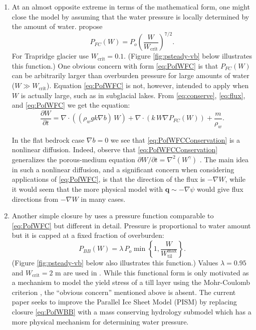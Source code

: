 \documentclass[11pt,final]{amsart}
\newcommand\bq{\mathbf{q}}
\newcommand{\Div}{\nabla\cdot}
\newcommand{\grad}{\nabla}
\newcommand{\Wtilmax}{W_{\text{til}}^{\text{max}}}
\begin{document}
\begin{enumerate}
\medskip

\item At an almost opposite extreme in terms of the mathematical form, one might close the model by assuming that the water pressure is locally determined by the amount of water.  \cite{FlowersClarke2002_theory} propose
\begin{equation}
P_{FC}(W) = P_o \left(\frac{W}{W_{\text{crit}}}\right)^{7/2}. \label{eq:PofWFC}
\end{equation}
For Trapridge glacier \cite{FlowersClarke2002_trapridge} use $W_{\text{crit}}=0.1$.  (Figure \ref{fig:psteady-vb} below illustrates this function.)  One obvious concern with form \eqref{eq:PofWFC} is that $P_{FC}(W)$ can be arbitrarily larger than overburden pressure for large amounts of water ($W \gg W_{\text{crit}}$).  Equation \eqref{eq:PofWFC} is not, however, intended to apply when $W$ is actually large, such as in subglacial lakes.  From \eqref{eq:conserve}, \eqref{eq:flux}, and \eqref{eq:PofWFC} we get the equation:
\begin{equation}
  \frac{\partial W}{\partial t} = \Div\left((\rho_w g k \grad b)\, W\right) + \Div \left(k\,W \grad P_{FC}(W)\right) + \frac{m}{\rho_w}. \label{eq:PofWFCConservation}
\end{equation}

In the flat bedrock case $\grad b=0$ we see that \eqref{eq:PofWFCConservation} is a nonlinear diffusion.  Indeed, \cite{Schoofetal2012} observe that \eqref{eq:PofWFCConservation} generalizes the porous-medium equation $\partial W/\partial t = \grad^2 (W^\gamma)$ \citep{VazquezPME}.  The main idea in such a nonlinear diffusion, and a significant concern when considering applications of \eqref{eq:PofWFC}, is that the direction of the flux is $-\grad W$, while it would seem that the more physical model with $\bq \sim -\grad \psi$ would give flux directions from $-\grad W$ in many cases.

\medskip

\item Another simple closure by \cite{BBssasliding} uses a pressure function comparable to \eqref{eq:PofWFC} but different in detail.  Pressure is proportional to water amount but it is capped at a fixed fraction of overburden:
\begin{equation}
P_{BB}(W) = \lambda\,P_o \min\left\{1,\frac{W}{\Wtilmax}\right\}. \label{eq:PofWBB}
\end{equation}
(Figure \ref{fig:psteady-vb} below also illustrates this function.)  Values $\lambda=0.95$ and $W_{\text{crit}}=2$ m are used in \citep{BBssasliding}.  While this functional form is only motivated as a mechanism to model the yield stress of a till layer using the Mohr-Coulomb criterion \citep{TrufferEchelmeyerHarrison,Tulaczyketal2000b}, the ``obvious concern'' mentioned above is absent.  The current paper seeks to improve the Parallel Ice Sheet Model (PISM) by replacing closure \eqref{eq:PofWBB} with a mass conserving hydrology submodel which has a more physical mechanism for determining water pressure.
\end{enumerate}
\end{document}
